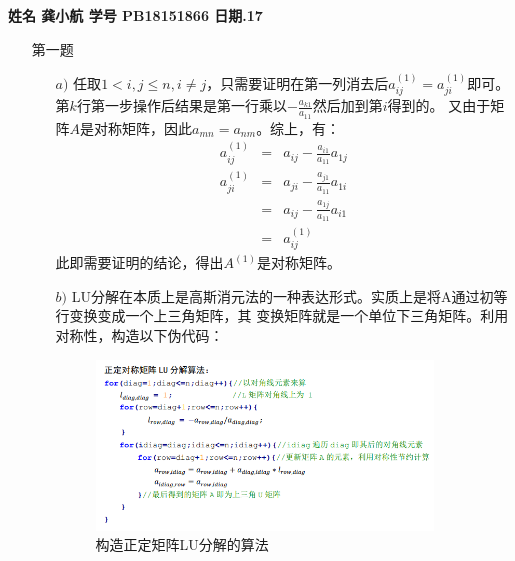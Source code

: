 \documentclass[12pt,a4paper,utf8]{ctexart}
\begin{document}


\begin{center}
    \begin{spacing}{2.0}%
        \textbf{}
     \end{spacing}
  
  \textbf{姓名 \quad 龚小航 \qquad  学号 \quad PB18151866  \qquad 日期.17}
\end{center}
\textit{}
\vspace{\baselineskip}

\begin{enumerate}
\item[第一题] 
  \begin{enumerate}
    \item[$a)$] 任取$1<i,j\leq n, i\neq j$，只需要证明在第一列消去后$a_{ij}^{(1)}=a_{ji}^{(1)}$即可。\\
            第$k$行第一步操作后结果是第一行乘以$-\frac{a_{k1}}{a_{11}}$然后加到第$i$得到的。
            又由于矩阵$A$是对称矩阵，因此$a_{mn}=a_{nm}$。综上，有：
        \begin{eqnarray} 
            a_{ij}^{(1)}&=&a_{ij}-\frac{a_{i1}}{a_{11}}a_{1j}\\
            a_{ji}^{(1)}&=&a_{ji}-\frac{a_{j1}}{a_{11}}a_{1i}\\
                        &=&a_{ij}-\frac{a_{1j}}{a_{11}}a_{i1}\\
                        &=&a_{ij}^{(1)}
        \end{eqnarray}     
            此即需要证明的结论，得出$A^{(1)}$是对称矩阵。

    \item[$b)$] LU分解在本质上是高斯消元法的一种表达形式。实质上是将A通过初等行变换变成一个上三角矩阵，其
            变换矩阵就是一个单位下三角矩阵。利用对称性，构造以下伪代码：\\
            \begin{figure}[h]
                \centering
                \includegraphics[width=0.9\textwidth]{H3T1B.png}
                \caption{构造正定矩阵LU分解的算法}
            \end{figure}


\end{enumerate}
\end{enumerate}
\end{document}
